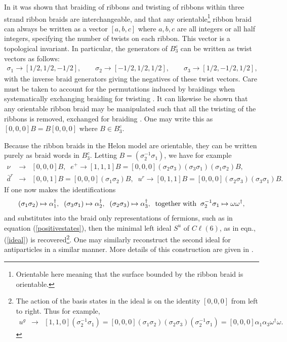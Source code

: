 \documentclass[a4paper]{jpconf}
\begin{document}
In \cite{Bilson-Thompson2009} it was shown that braiding of ribbons and twisting of ribbons within three strand ribbon braids are interchangeable, and that any orientable\footnote{Orientable here meaning that the surface bounded by the ribbon braid is orientable.} ribbon braid can always be written as a vector $[a,b,c]$ where $a,b,c$ are all integers or all half integers, specifying the number of twists on each ribbon. This vector is a topological invariant. In particular, the generators of $B^c_3$ can be written as twist vectors as follows:
\begin{eqnarray}\label{braidgenerators}
\sigma_1\rightarrow \left[ 1/2,1/2,-1/2\right] ,\qquad \sigma_2\rightarrow \left[ -1/2,1/2,1/2\right],\qquad \sigma_3\rightarrow \left[ 1/2,-1/2,1/2\right],
\end{eqnarray}
with the inverse braid generators giving the negatives of these twist vectors. Care must be taken to account for the permutations induced by braidings when systematically exchanging braiding for twisting \cite{Bilson-Thompson2009}. It can likewise be shown that any orientable ribbon braid may be manipulated such that all the twisting of the ribbons is removed, exchanged for braiding \cite{gresnigt2018knotted}. One may write this as $[0,0,0]B=B[0,0,0]$ where $B\in B_3^c$.

Because the ribbon braids in the Helon model are orientable, they can be written purely as braid words in $B_3^c$. Letting $B=(\sigma_2^{-1}\sigma_1)$, we have for example
\begin{eqnarray}
\nonumber\nu &\rightarrow&  [0,0,0]B,\;\;e^+\rightarrow  [1,1,1]B=[0,0,0](\sigma_2\sigma_3)(\sigma_3\sigma_1)(\sigma_1\sigma_2)B,\\
\bar{d}^r &\rightarrow & [0,0,1]B=[0,0,0](\sigma_1\sigma_2)B,\;\;u^r \rightarrow  [0,1,1]B=[0,0,0](\sigma_2\sigma_3)(\sigma_3\sigma_1)B.
\label{positivestates}
\end{eqnarray}
If one now makes the identifications
\begin{eqnarray}\label{alphadagger}
(\sigma_1\sigma_2)\mapsto\alpha_1^{\dagger},\;\;(\sigma_3\sigma_1)\mapsto\alpha_2^{\dagger},\;\;(\sigma_2\sigma_3)\mapsto\alpha_3^{\dagger},\;\;\textrm{together\;with}\;\; \sigma_2^{-1}\sigma_1\mapsto\omega\omega^{\dagger},
\end{eqnarray}
and substitutes into the braid only representations of fermions, such as in equation (\ref{positivestates}), then the minimal left ideal $S^u$ of $C\ell(6)$, as in eqn., (\ref{ideal}) is recovered\footnote{The action of the basis states in the ideal is on the identity $[0,0,0]$ from left to right. Thus for example,
\begin{eqnarray}
\nonumber u^g &\rightarrow & [1,1,0](\sigma_2^{-1}\sigma_1)=[0,0,0](\sigma_1\sigma_2)(\sigma_2\sigma_3)(\sigma_2^{-1}\sigma_1)=[0,0,0]\alpha_1\alpha_3\omega^{\dagger}\omega.
\end{eqnarray}}. One may similarly reconstruct the second ideal for antiparticles in a similar manner. More details of this construction are given in \cite{gresnigt2018braids}.
\end{document}
